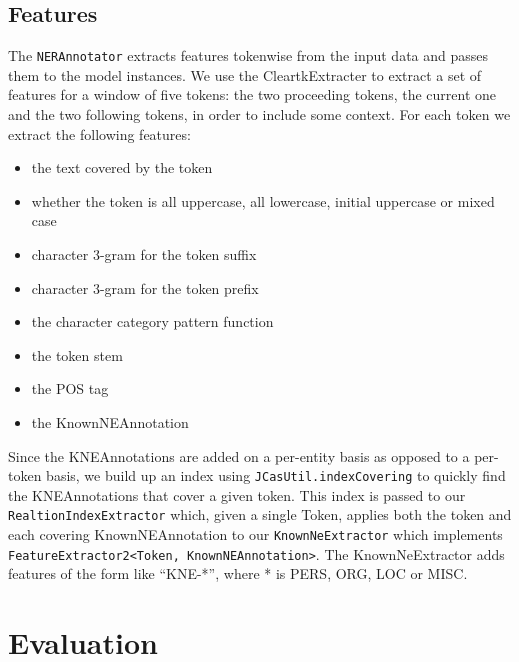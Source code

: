 \documentclass{article}
\begin{document}
\subsection{Features}
The \texttt{NERAnnotator} extracts features tokenwise from the input data and passes them to the model instances. We use the CleartkExtracter to extract a set of features for a window of five tokens: the two proceeding tokens, the current one and the two following tokens, in order to include some context. For each token we extract the following features:
\begin{itemize}
\item the text covered by the token
\item whether the token is all uppercase, all lowercase, initial uppercase or mixed case
\item character 3-gram for the token suffix
\item character 3-gram for the token prefix
\item the character category pattern function
\item the token stem
\item the POS tag
\item the KnownNEAnnotation
\end{itemize}
Since the KNEAnnotations are added on a per-entity basis as opposed to a per-token basis, we build up an index using \texttt{JCasUtil.indexCovering} to quickly find the KNEAnnotations that cover a given token.
This index is passed to our \texttt{RealtionIndexExtractor} which, given a single Token, applies both the token and each covering KnownNEAnnotation to our \texttt{KnownNeExtractor} which implements \texttt{FeatureExtractor2<Token, KnownNEAnnotation>}. The KnownNeExtractor adds features of the form like \enquote{KNE-*}, where * is PERS, ORG, LOC or MISC.


\section{Evaluation}




\end{document}
